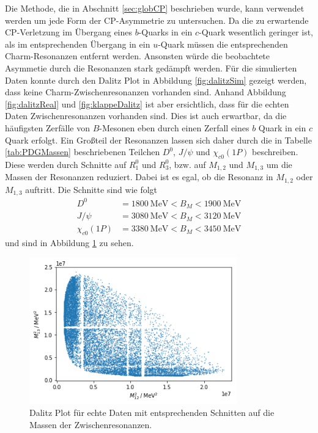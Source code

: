 Die Methode, die in Abschnitt \ref{sec:globCP} beschrieben wurde, kann verwendet werden um jede Form der CP-Asymmetrie zu untersuchen.
Da die zu erwartende CP-Verletzung im Übergang eines $b$-Quarks in ein $c$-Quark wesentlich geringer ist, als im entsprechenden Übergang in ein $u$-Quark müssen die entsprechenden Charm-Resonanzen entfernt werden.
Ansonsten würde die beobachtete Asymmetie durch die Resonanzen stark gedämpft werden.
Für die simulierten Daten konnte durch den Dalitz Plot in Abbildung \ref{fig:dalitzSim} gezeigt werden, dass keine Charm-Zwischenresonanzen vorhanden sind.
Anhand Abbildung \ref{fig:dalitzReal} und \ref{fig:klappeDalitz} ist aber ersichtlich, dass für die echten Daten Zwischenresonanzen vorhanden sind.
Dies ist auch erwartbar, da die häufigsten Zerfälle von $B$-Mesonen eben durch einen Zerfall eines $b$ Quark in ein $c$ Quark erfolgt.
Ein Großteil der Resonanzen lassen sich daher durch die in Tabelle \ref{tab:PDGMassen} beschriebenen Teilchen $D^0$, $J/\psi$ und $\chi_{c0}\left(1P\right)$ beschreiben.
Diese werden durch Schnitte auf $R_1^0$ und $R_3^0$, bzw. auf $M_{1,2}$ und $M_{1,3}$ um die Massen der Resonanzen reduziert.
Dabei ist es egal, ob die Resonanz in $M_{1,2}$ oder $M_{1,3}$ auftritt.
Die Schnitte sind wie folgt
\begin{align*}
  D^0 &= \SI{1800}{\mega\electronvolt} < B_M < \SI{1900}{\mega\electronvolt}  \\
  J/\psi &= \SI{3080}{\mega\electronvolt} < B_M < \SI{3120}{\mega\electronvolt} \\
  \chi_{c0}\left(1P\right) &= \SI{3380}{\mega\electronvolt} < B_M < \SI{3450}{\mega\electronvolt}
\end{align*}
und sind in Abbildung \ref{fig:schnibbelDalitz} zu sehen.

\begin{figure}
  \centering
  \includegraphics[width=0.8\textwidth]{plots/real_data_dalitz_removed_resonances.png}
  \caption{Dalitz Plot für echte Daten mit entsprechenden Schnitten auf die Massen der Zwischenresonanzen.}
  \label{fig:schnibbelDalitz}
\end{figure}

